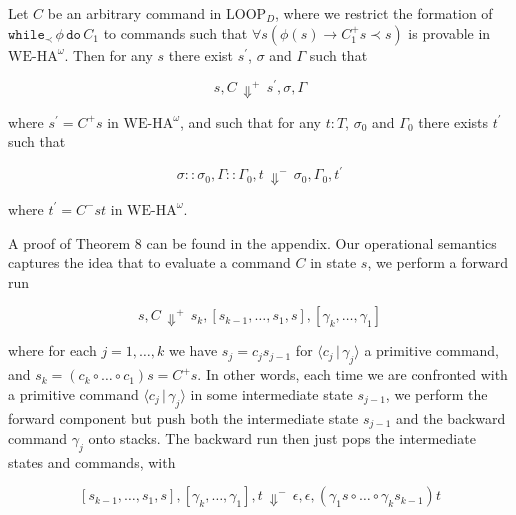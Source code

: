 \documentclass[10pt,a4paper]{article}
\begin{document}
 
Let $C$ be an arbitrary command in $\mathrm{LOOP}_{D}$, where we restrict the formation of $\mathtt{while}_{\prec}\,{\phi}\,\mathtt{do}\,{C_{1}}$ to commands such that $\forall s(\phi(s)\to C_{1}^{+}s\prec s)$ is provable in $\mathrm{WE}\mbox{-}\mathrm{HA}^{\omega}$. Then for any $s$ there exist $s^{\prime}$, $\sigma$ and $\Gamma$ such that\par
  
\par  \quad  \[{s},{C}\,{\Downarrow^{+}}\,{s^{\prime}},{\sigma},{\Gamma}\]\quad  \quad  
  
where $s^{\prime}=C^{+}s$ in $\mathrm{WE}\mbox{-}\mathrm{HA}^{\omega}$, and such that for any $t:T$, $\sigma_{0}$ and $\Gamma_{0}$ there exists $t^{\prime}$ such that\par
  
\par  \quad  \[{\sigma::\sigma_{0}},{\Gamma::\Gamma_{0}},{t}\,{\Downarrow^{-}}\,{\sigma_{0}},{\Gamma_{0}},{t^{\prime}}\]\quad  \quad  
  
where $t^{\prime}=C^{-}st$ in $\mathrm{WE}\mbox{-}\mathrm{HA}^{\omega}$.\par
 
 

 
 
A proof of Theorem 8 can be found in the appendix. Our operational semantics captures the idea that to evaluate a command $C$ in state $s$, we perform a forward run\par
  
\par  \quad  \[{s},{C}\,{\Downarrow^{+}}\,{s_{k}},{[s_{k-1},\ldots,s_{1},s]},{[\gamma_{k},\ldots,\gamma_{1}]}\]\quad  \quad  
  
where for each $j=1,\ldots,k$ we have $s_{j}=c_{j}s_{j-1}$ for $\langle{c_{j}}\,|\,{\gamma_{j}}\rangle$ a primitive command, and $s_{k}=(c_{k}\circ\ldots\circ c_{1})s=C^{+}s$. In other words, each time we are confronted with a primitive command $\langle{c_{j}}\,|\,{\gamma_{j}}\rangle$ in some intermediate state $s_{j-1}$, we perform the forward component but push both the intermediate state $s_{j-1}$ and the backward command $\gamma_{j}$ onto stacks. The backward run then just pops the intermediate states and commands, with\par
  
\par  \quad  \[{[s_{k-1},\ldots,s_{1},s]},{[\gamma_{k},\ldots,\gamma_{1}]},{t}\,{\Downarrow^{-}}\,{\epsilon},{\epsilon},{(\gamma_{1}s\circ\ldots\circ\gamma_{k}s_{k-1})t}\]\quad  \quad  
  
\end{document}
